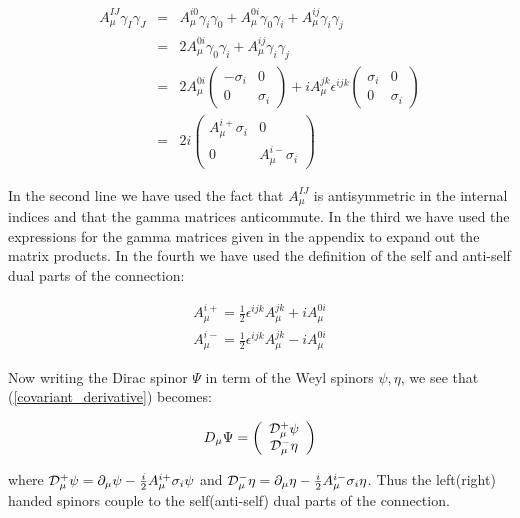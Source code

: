 \begin{doublespace}
\begin{eqnarray}\label{connection_decomp}
    A_\mu^{IJ}\gamma_I\gamma_J & = & A_\mu^{i0}\gamma_i\gamma_0 +
    A_\mu^{0i}\gamma_0\gamma_i + A_\mu^{ij} \gamma_i\gamma_j \nonumber \\
    & = & 2A_\mu^{0i}\gamma_0\gamma_i+ A_\mu^{ij}\gamma_i\gamma_j \nonumber  \\
    & = & 2A_\mu^{0i}\left(\begin{array}{cc}-\sigma_i&0\\0&\sigma_i\end{array}\right)
    + iA_\mu^{jk}\epsilon^{ijk}\left(\begin{array}{cc}\sigma_i&0\\0&\sigma_i\end{array}\right)\nonumber \\
    & = & 2i\left(\begin{array}{cc}A_\mu^{i+}\sigma_i&0\\0&A_\mu^{i-}\sigma_i\end{array}\right)
\end{eqnarray}

In the second line we have used the fact that $A_\mu^{IJ}$ is antisymmetric in the internal indices
and that the gamma matrices anticommute. In the third we have used the expressions for the gamma
matrices given in the appendix to expand out the matrix products. In the fourth we have used the
definition of the self and anti-self dual parts of the connection:

\begin{eqnarray}
    A_\mu^{i+} = \frac{1}{2}\epsilon^{ijk}A_\mu^{jk} + iA_\mu^{0i} \nonumber \\
    A_\mu^{i-} = \frac{1}{2}\epsilon^{ijk}A_\mu^{jk} - iA_\mu^{0i}
\end{eqnarray}

Now writing the Dirac spinor $\Psi$ in term of the Weyl spinors $\psi, \eta$, we see that
(\ref{covariant_derivative}) becomes:

\begin{equation}
    D_\mu\Psi = \left(\begin{array}{c}{\cal D}_\mu^+\psi\\{\cal D}_\mu^-\eta\end{array}\right)
\end{equation}

where ${\cal D}_\mu^+\psi=\partial_\mu\psi-\frac{i}{2}A_\mu^{i+}\sigma_i\psi$ and ${\cal
D}_\mu^-\eta=\partial_\mu\eta-\frac{i}{2}A_\mu^{i-}\sigma_i\eta$. Thus the left(right) handed
spinors couple to the self(anti-self) dual parts of the connection.


\end{doublespace}
